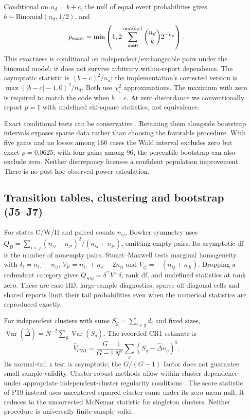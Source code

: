Conditional on $n_d=b+c$, the null of equal event probabilities gives $b\sim\mathrm{Binomial}(n_d,1/2)$, and
\begin{equation}
 p_{\rm exact}=\min\left(1,2\sum_{k=0}^{\min(b,c)}{n_d\choose k}2^{-n_d}\right).
\end{equation}
This exactness is conditional on independent/exchangeable pairs under the binomial model; it does not survive arbitrary within-report dependence. The asymptotic statistic is $(b-c)^2/n_d$; the implementation's corrected version is $\max(|b-c|-1,0)^2/n_d$. Both use $\chi^2_1$ approximations. The maximum with zero is required to match the code when $b=c$. At zero discordance we conventionally report $p=1$ with undefined chi-square statistics, not equivalence.

Exact conditional tests can be conservative \citep{fagerland}. Retaining them alongside bootstrap intervals exposes sparse data rather than choosing the favorable procedure. With five gains and no losses among 160 cases the Wald interval excludes zero but exact $p=0.0625$; with four gains among 96, the percentile bootstrap can also exclude zero. Neither discrepancy licenses a confident population improvement. There is no post-hoc observed-power calculation.

\subsection{Transition tables, clustering and bootstrap (J5--J7)}
For states C/W/H and paired counts $n_{ij}$, Bowker symmetry uses $Q_B=\sum_{i<j}(n_{ij}-n_{ji})^2/(n_{ij}+n_{ji})$, omitting empty pairs. Its asymptotic df is the number of nonempty pairs. Stuart--Maxwell tests marginal homogeneity with $\delta_i=n_{i\cdot}-n_{\cdot i}$, $V_{ii}=n_{i\cdot}+n_{\cdot i}-2n_{ii}$ and $V_{ij}=-(n_{ij}+n_{ji})$. Dropping a redundant category gives $Q_{SM}=\delta^\top V^+\delta$, rank df, and undefined statistics at rank zero. These are case-IID, large-sample diagnostics; sparse off-diagonal cells and shared reports limit their tail probabilities even when the numerical statistics are reproduced exactly.

For independent clusters with sums $S_g=\sum_{i\in g}d_i$ and fixed sizes, $\operatorname{Var}(\widehat\Delta)=N^{-2}\sum_g\operatorname{Var}(S_g)$. The recorded CR1 estimate is
\begin{equation}
 \widehat V_{CR1}=\frac{G}{G-1}\frac{1}{N^2}\sum_g(S_g-\widehat\Delta n_g)^2.
\end{equation}
Its normal-tail $z$ test is asymptotic; the $G/(G-1)$ factor does not guarantee small-sample validity. Cluster-robust methods allow within-cluster dependence under appropriate independent-cluster regularity conditions \citep{cameron}. The score statistic of P10 instead uses uncentered squared cluster sums under its zero-mean null. It reduces to the uncorrected McNemar statistic for singleton clusters. Neither procedure is universally finite-sample valid.

